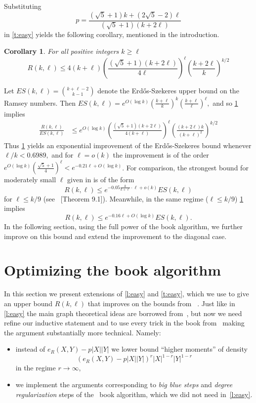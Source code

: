 \documentclass[reqno,final,12pt]{amsart}
\newtheorem{cor}[thm]{Corollary}
\newcommand{\fs}[2]{\left(\frac{#1}{#2}\right)}
\begin{document}
Substituting $$p=\frac{(\sqrt{5}+1) k+(2\sqrt{5}-2)\ell}{\left(\sqrt{5}+1\right) (k+2 \ell)}$$ in \cref{t:easy} yields the following corollary, mentioned in the introduction.

\begin{cor}\label{c:easy}
	For all positive integers $k \geq \ell$ $$R(k,\ell) \leq 4(k+\ell)\fs{\left(\sqrt{5}+1\right) (k+2 \ell)}{4 \ell}^\ell \fs{k + 2\ell}{k}^{k/2} $$
\end{cor}

Let $ES(k,\ell)=\binom{k+\ell-2}{k-1}$ denote the Erd\H{o}s-Szekeres upper bound on the Ramsey numbers. Then $ES(k,\ell)=e^{O(\log k)}\fs{k+\ell}{k}^{k}\fs{k+\ell}{\ell}^{\ell},$  and so \cref{c:easy} implies
\begin{align*} \frac{R(k,\ell)}{ES(k,\ell)} &\leq e^{O(\log k)}\fs{(\sqrt{5}+1)(k+2\ell)}{4(k+\ell)}^{\ell}\fs{(k+2\ell)k}{(k+\ell)^2}^{k/2} 
\end{align*}
Thus \cref{c:easy} yields an exponential improvement of the Erd\H{o}s-Szekeres bound whenever $\ell/k < 0.6989,$ and for $\ell=o(k)$ the improvement is of the order $e^{O(\log k)}\fs{\sqrt{5}+1}{4}^{\ell} < e^{-0.21\ell+O(\log k)}$.
For comparison, the strongest bound for moderately small $\ell$ given in \cite{CGMS23} is of the form $$R(k,\ell) \leq e^{-0.05\frac{k}{k+\ell}\cdot\ell+o(k)}ES(k,\ell)$$
for $\ell \leq k/9$ (see ~[Theorem 9.1]\cite{CGMS23}).
Meanwhile, in the same regime ($\ell \leq k/9$) \cref{c:easy} implies 
$$R(k,\ell) \leq e^{-0.16\ell+O(\log k)}ES(k,\ell).$$
In the following section, using the full power of the book algorithm, we further improve on this bound and extend the improvement to the diagonal case.

\section{Optimizing the book algorithm}\label{s:book}	

In this section we present extensions of \cref{l:easy} and \cref{t:easy},  which we use to give an upper bound $R(k,\ell)$ that improves on the bounds from ~\cite{CGMS23}. Just like in \cref{l:easy} the main graph theoretical ideas are borrowed from~\cite{CGMS23}, but now we need refine our inductive statement and to use every trick in the book from~\cite{CGMS23} making the argument substantially more technical. Namely:
\begin{itemize}
	\item instead of $e_R(X,Y) - p|X||Y|$ we lower bound ``higher moments'' of density $$(e_R(X,Y) - p|X||Y|)^r|X|^{1-r}|Y|^{1-r}$$ in the regime $r \to \infty$,
	\item we implement the arguments corresponding to \emph{big blue steps} and \emph{degree regularization} steps of the~\cite{CGMS23} book algorithm, which we did not need in~\cref{l:easy}.  
\end{itemize}	
\end{document}
